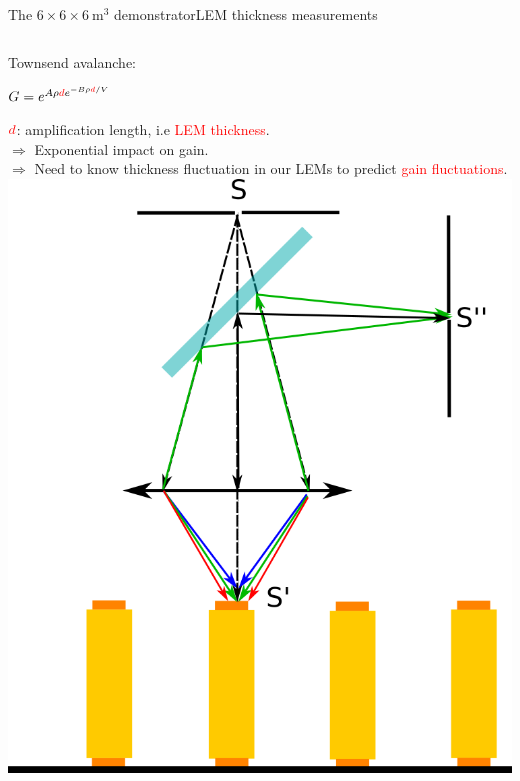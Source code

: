 \documentclass[10pt]{beamer}
\begin{document}
    \begin{frame}{The \texorpdfstring{$6 \times 6 \times \SI{6}{\meter\cubed}$}{666} demonstrator}{LEM thickness measurements}
    	\begin{scriptsize}
    		\begin{columns}
    			\begin{column}{0.48\textwidth}
    				Townsend avalanche:\\
    				\begin{center}
	    				$G = e^{A\rho \textcolor{red}{d} e^{-B\rho \textcolor{red}{d}/V}}$\\
    				\end{center}
    				$\textcolor{red}{d}$: amplification length, i.e \textcolor{red}{LEM thickness}.\\
    				$\Rightarrow$ Exponential impact on gain.\\
    				$\Rightarrow$ Need to know thickness fluctuation in our LEMs to predict \textcolor{red}{gain fluctuations}.\\
    				\vfill
    				\centering \includegraphics[height=0.5\textheight]{figures/666/CCI.png}\\\vfill

\end{column}
\end{columns}
\end{scriptsize}
\end{frame}
\end{document}
